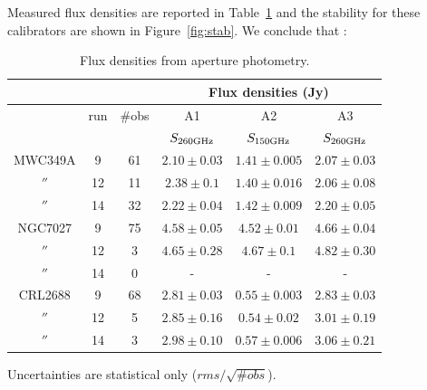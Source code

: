 Measured flux densities are reported in Table~\ref{tab:flux_Ap}
and the  stability for these calibrators  are shown in Figure~\ref{fig:stab}. We conclude that :




\begin{table}[th]
\begin{center}
\begin{threeparttable}
\begin{tabular}{|c|c|c|c|c|c|}
\hline
\multicolumn{3}{|c}{}  & \multicolumn{3}{|c|}{Flux densities (Jy)}   \\
\hline
         & run  & \#obs &  A1                    &  A2                   &    A3                    \\
         &      &      &  $S_{260 {\rm GHz}}$     &  $S_{150 {\rm GHz}}$  & $S_{260 {\rm GHz}}$    \\
\hline\hline
MWC349A   &  9   & 61  &  $2.10\pm0.03$   &  $1.41\pm0.005$  &  $2.07\pm0.03$       \\
  $''$    & 12   & 11  &  $2.38\pm0.1$   &   $1.40\pm0.016$ &  $2.06\pm0.08$                  \\ 
  $''$    & 14   & 32  &  $2.22\pm0.04$   &  $1.42\pm0.009$ &  $2.20\pm0.05$                  \\
  \hline
NGC7027  &  9   & 75  &  $4.58\pm0.05$   &  $4.52\pm0.01$  & $4.66\pm0.04$        \\
  $''$   & 12   &  3  &  $4.65\pm0.28$   &  $4.67\pm0.1$  & $4.82\pm0.30$                    \\ 
  $''$   & 14   &  0  &    -             &  -              &  -                   \\
  \hline
CRL2688  &  9   & 68  &  $2.81\pm0.03$   &  $0.55\pm0.003$   &  $2.83\pm0.03$      \\
  $''$   & 12   &  5  &  $2.85\pm0.16$   &  $0.54\pm0.02$    &  $3.01\pm0.19$                   \\
  $''$   & 14   &  3  &  $2.98\pm0.10$   &  $0.57\pm0.006$   &  $3.06\pm0.21$                   \\
\hline
\end{tabular}
\begin{tablenotes}
{\small
  \item[]  Uncertainties are statistical only ($rms/\sqrt{\#obs}$).
}
  \end{tablenotes}
\end{threeparttable}
\caption{Flux densities from aperture photometry.}
\label{tab:flux_Ap}
\end{center}
\end{table}



